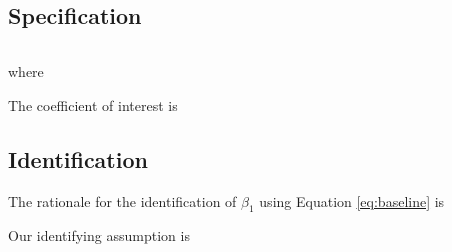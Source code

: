 \subsection{Specification}

\setlength{\abovedisplayskip}{-0pt}

\begin{equation}
\label{eq:baseline}
\end{equation}

where

The coefficient of interest is 

\subsection{Identification}

The rationale for the identification of $\beta_{1}$ using Equation \ref{eq:baseline} is 

Our identifying assumption is 
